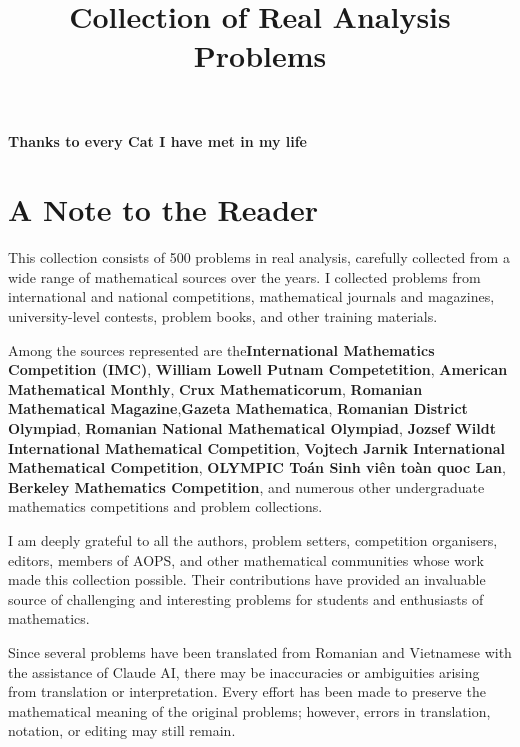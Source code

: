 \documentclass[12pt]{article}
\title{\Huge\bfseries Collection of Real Analysis Problems}
\author{}
\date{}
\begin{document}
\maketitle

\newpage
\begin{center}
	\vspace*{\fill}
	
	\textbf{Thanks to every Cat I have met in my life}
	
	
	\vspace*{\fill}
\end{center}
\newpage
\section*{A Note to the Reader}

This collection consists of 500 problems in real analysis, carefully collected from a wide range of mathematical sources over the years. I collected problems from international and national competitions, mathematical journals and magazines, university-level contests, problem books, and other training materials.

Among the sources represented are the\textbf{International Mathematics Competition (IMC)}, \textbf{William Lowell Putnam Competetition}, \textbf{American Mathematical Monthly}, \textbf{Crux Mathematicorum}, \textbf{Romanian Mathematical Magazine},\textbf{Gazeta Mathematica}, \textbf{Romanian District Olympiad}, \textbf{Romanian National Mathematical Olympiad}, \textbf{Jozsef Wildt International Mathematical Competition}, \textbf{Vojtech Jarnik International Mathematical Competition}, \textbf{OLYMPIC Toán Sinh viên toàn quoc Lan}, \textbf{Berkeley Mathematics Competition}, and numerous other undergraduate mathematics competitions and problem collections.

I am deeply grateful to all the authors, problem setters, competition organisers, editors, members of AOPS, and other mathematical communities whose work made this collection possible. Their contributions have provided an invaluable source of challenging and interesting problems for students and enthusiasts of mathematics.

Since several problems have been translated from Romanian and Vietnamese with the assistance of Claude AI, there may be inaccuracies or ambiguities arising from translation or interpretation. Every effort has been made to preserve the mathematical meaning of the original problems; however, errors in translation, notation, or editing may still remain.
\medskip
\end{document}
